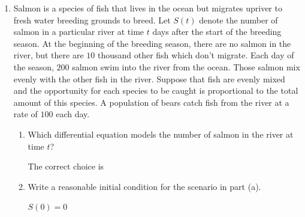 \documentclass[main]{subfiles}
\begin{document}
\begin{enumerate}
  

\item Salmon is a species of fish that lives in the ocean but migrates upriver to fresh water breeding grounds to breed.  Let $S(t)$ denote the number of salmon in a particular river at time $t$ days after the start of the breeding season. 
At the beginning of the breeding season, there are no salmon in the river, but there are $10$ thousand other fish which don't migrate.
Each day of the season, $200$ salmon swim into the river from the ocean.  Those salmon mix evenly with the other fish in the river. Suppose that fish are evenly mixed and the opportunity for each species to be caught is proportional to the total amount of this species.  A population of bears catch fish from the river at a rate of $100$ each day. 
\begin{enumerate}
 \item 
\begin{problem}[2in]
Which differential equation models the number of salmon in the river at time $t$?
 \begin{enumerate}
  \end{enumerate}
\end{problem}

\begin{solution}
    The correct choice is 
\end{solution}

 
 
  \bigskip
  
\item 
\begin{problem}
Write a reasonable initial condition for the scenario in part (a).
\end{problem}

\begin{solution}
  $\boxed{S(0)=0}$
\end{solution}
\end{enumerate}



\end{enumerate}
\end{document}
